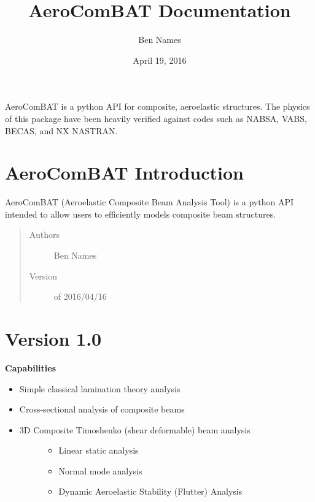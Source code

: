\documentclass[letterpaper,10pt,english]{sphinxmanual}
\title{AeroComBAT Documentation}
\date{April 19, 2016}
\author{Ben Names}
\begin{document}
\maketitle
\tableofcontents
{}\label{index::doc}


AeroComBAT is a python API for composite, aeroelastic structures. The physics
of this package have been heavily verified against codes such as NABSA, VABS,
BECAS, and NX NASTRAN.


\chapter{AeroComBAT Introduction}
\label{index:welcome-to-aerocombat-s-documentation}\label{index:aerocombat-introduction}
AeroComBAT (Aeroelastic Composite Beam Analysis Tool) is a python API intended
to allow users to efficiently models composite beam structures.
\begin{quote}\begin{description}
\item[{Authors}] \leavevmode
Ben Names

\item[{Version}]  of 2016/04/16

\end{description}\end{quote}


\chapter{Version 1.0}
\label{index:version-1-0}
\textbf{Capabilities}
\begin{itemize}
\item {} 
Simple classical lamination theory analysis

\item {} 
Cross-sectional analysis of composite beams

\item {} \begin{description}
\item[{3D Composite Timoshenko (shear deformable) beam analysis}] \leavevmode\begin{itemize}
\item {} 
Linear static analysis

\item {} 
Normal mode analysis

\item {} 
Dynamic Aeroelastic Stability (Flutter) Analysis

\end{itemize}

\end{description}

\end{itemize}
\end{document}
